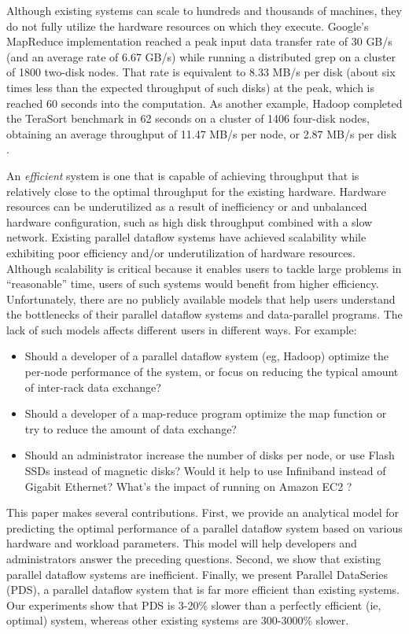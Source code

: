 \documentclass[ 11pt, letterpaper]{article}%
\begin{document}
Although existing systems can scale to hundreds and thousands of machines, they
do not fully utilize the hardware resources on which they execute. Google's
MapReduce implementation reached a peak input data transfer rate of 30 GB/s
(and an average rate of 6.67 GB/s) while running a distributed grep on a cluster
of 1800 two-disk nodes. That rate is equivalent to 8.33 MB/s per disk (about six times less than the expected
throughput of such disks) at the peak, which is
reached 60 seconds into the computation. As another example, Hadoop completed
the TeraSort benchmark \cite{sortbenchmark} in 62 seconds on a cluster of 1406
four-disk nodes, obtaining an average throughput of 11.47 MB/s per node, or
2.87 MB/s per disk \cite{hadoop2009}.

An \emph{efficient} system is
one that is capable of achieving throughput that is relatively close to the
optimal throughput for the existing hardware. Hardware resources can be underutilized
as a result of inefficiency or and unbalanced hardware configuration, such as
high disk throughput combined with a slow network. Existing parallel
dataflow systems have achieved scalability while exhibiting poor efficiency
and/or underutilization of hardware resources. Although scalability is critical
because it enables users to tackle large problems in ``reasonable'' time, users of such systems would benefit from higher efficiency. Unfortunately, there are no publicly available models that help users understand the bottlenecks of their parallel dataflow systems and data-parallel programs. The lack of such models affects different users in different ways. For example:
\begin{itemize}
  \item Should a developer of a parallel dataflow system (eg, Hadoop) optimize
  the per-node performance of the system, or focus on reducing the typical amount of inter-rack data exchange?
  \item Should a developer of a map-reduce program optimize the map function
  or try to reduce the amount of data exchange?
  \item Should an administrator increase the number of disks per
  node, or use Flash SSDs instead of magnetic disks? Would it help to use
  Infiniband instead of Gigabit Ethernet? What's the impact of running on Amazon EC2
  \cite{amazonec2}?
\end{itemize}

This paper makes several contributions. First, we provide an analytical model
for predicting the optimal performance of a parallel dataflow system based on
various hardware and workload parameters. This model will help developers and
administrators answer the preceding questions. Second, we show that
existing parallel dataflow systems are inefficient. Finally, we present Parallel
DataSeries (PDS), a parallel dataflow system that is far more
efficient than existing systems. Our experiments show that PDS is 3-20\% slower
than a perfectly efficient (ie, optimal) system, whereas other existing systems
are 300-3000\% slower.
\end{document}
